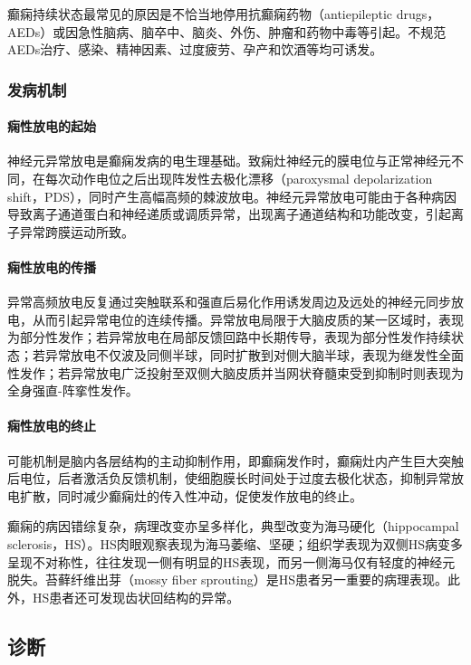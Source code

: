 癫痫持续状态最常见的原因是不恰当地停用抗癫痫药物（antiepileptic
drugs，AEDs）或因急性脑病、脑卒中、脑炎、外伤、肿瘤和药物中毒等引起。不规范AEDs治疗、感染、精神因素、过度疲劳、孕产和饮酒等均可诱发。

\subsubsection{发病机制}

\paragraph{痫性放电的起始}

神经元异常放电是癫痫发病的电生理基础。致痫灶神经元的膜电位与正常神经元不同，在每次动作电位之后出现阵发性去极化漂移（paroxysmal
depolarization
shift，PDS），同时产生高幅高频的棘波放电。神经元异常放电可能由于各种病因导致离子通道蛋白和神经递质或调质异常，出现离子通道结构和功能改变，引起离子异常跨膜运动所致。

\paragraph{痫性放电的传播}

异常高频放电反复通过突触联系和强直后易化作用诱发周边及远处的神经元同步放电，从而引起异常电位的连续传播。异常放电局限于大脑皮质的某一区域时，表现为部分性发作；若异常放电在局部反馈回路中长期传导，表现为部分性发作持续状态；若异常放电不仅波及同侧半球，同时扩散到对侧大脑半球，表现为继发性全面性发作；若异常放电广泛投射至双侧大脑皮质并当网状脊髓束受到抑制时则表现为全身强直-阵挛性发作。

\paragraph{痫性放电的终止}

可能机制是脑内各层结构的主动抑制作用，即癫痫发作时，癫痫灶内产生巨大突触后电位，后者激活负反馈机制，使细胞膜长时间处于过度去极化状态，抑制异常放电扩散，同时减少癫痫灶的传入性冲动，促使发作放电的终止。

癫痫的病因错综复杂，病理改变亦呈多样化，典型改变为海马硬化（hippocampal
sclerosis，HS）。HS肉眼观察表现为海马萎缩、坚硬；组织学表现为双侧HS病变多呈现不对称性，往往发现一侧有明显的HS表现，而另一侧海马仅有轻度的神经元脱失。苔藓纤维出芽（mossy
fiber
sprouting）是HS患者另一重要的病理表现。此外，HS患者还可发现齿状回结构的异常。

\subsection{诊断}

